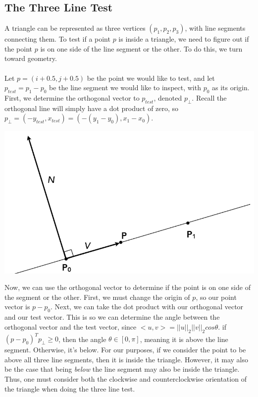 \documentclass{article}
\begin{document}
\subsection{The Three Line Test}
A triangle can be represented as three vertices $(p_1, p_2, p_3)$, with line segments connecting them. To test if a point $p$ is inside a triangle, we need to figure out if the point $p$ is on one side of the line segment or the other. To do this, we turn toward geometry.
\\
\\
Let $p = (i + 0.5, j + 0.5)$ be the point we would like to test, and let $p_{test} = p_1 - p_0$ be the line segment we would like to inspect, with $p_0$ as its origin. First, we determine the orthogonal vector to $p_{test}$, denoted $p_{\perp}$. Recall the orthogonal line will simply have a dot product of zero, so $p_{\perp} = (-y_{test}, x_{test}) = (-(y_1 - y_0), x_1 - x_0)$. 
\begin{center}
 \includegraphics[]{Task 1/orthogonal.png}   
\end{center}
Now, we can use the orthogonal vector to determine if the point is on one side of the segment or the other. First, we must change the origin of $p$, so our point vector is $p - p_0$. Next, we can take the dot product with our orthogonal vector and our test vector. This is so we can determine the angle between the orthogonal vector and the test vector, since $<u, v> = ||u||_2||v||_2cos\theta$. if $(p - p_0)^Tp_{\perp} \geq 0$, then the angle $\theta \in [0, \pi]$, meaning it is above the line segment. Otherwise, it's below. For our purposes, if we consider the point to be above all three line segments, then it is inside the triangle. However, it may also be the case that being \textit{below} the line segment may also be inside the triangle. Thus, one must consider both the clockwise and counterclockwise orientation of the triangle when doing the three line test.
\end{document}
